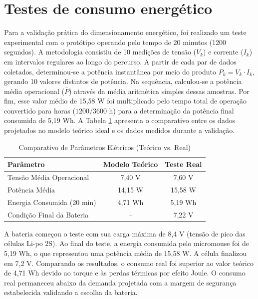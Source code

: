 \section{Testes de consumo energético}

Para a validação prática do dimensionamento energético, foi realizado um teste experimental com o protótipo operando pelo tempo de 20 minutos (1200 segundos). A metodologia consistiu de 10 medições de tensão ($V_k$) e corrente ($I_k$) em intervalos regulares ao longo do percurso. A partir de cada par de dados coletados, determinou-se a potência instantânea por meio do produto $P_k = V_k \cdot I_k$, gerando 10 valores distintos de potência. Na sequência, calculou-se a potência média operacional ($\bar{P}$) através da média aritmética simples dessas amostras. Por fim, esse valor médio de 15,58 W foi multiplicado pelo tempo total de operação convertido para horas ($1200/3600$ h) para a determinação da potência final consumida de 5,19 Wh. A Tabela \ref{tab:comparativo_eletrico} apresenta o comparativo entre os dados projetados no modelo teórico ideal e os dados medidos durante a validação.

\begin{table}[h!]
\centering
\caption{Comparativo de Parâmetros Elétricos (Teórico vs. Real)}
\label{tab:comparativo_eletrico}
\renewcommand{\arraystretch}{1.3}
\begin{tabular}{lcc}
\hline
\textbf{Parâmetro} & \textbf{Modelo Teórico} & \textbf{Teste Real} \\ \hline
Tensão Média Operacional & 7,40 V & 7,60 V \\ 
Potência Média & 14,15 W & 15,58 W \\ 
Energia Consumida (20 min) & 4,71 Wh & 5,19 Wh \\ 
Condição Final da Bateria & -- & 7,22 V \\ \hline
\end{tabular}
\end{table}

A bateria começou o teste com sua carga máxima de 8,4 V (tensão de pico das células Li-po 2S). Ao final do teste, a energia consumida pelo micromouse foi de 5,19 Wh, o que representou uma potência média de 15,58 W. A célula finalizou em 7,2 V.
Comparando os resultados, o consumo real foi superior ao valor teórico de 4,71 Wh devido ao torque e às perdas térmicas por efeito Joule. O consumo real permaneceu abaixo da demanda projetada com a margem de segurança estabelecida validando a escolha da bateria.


